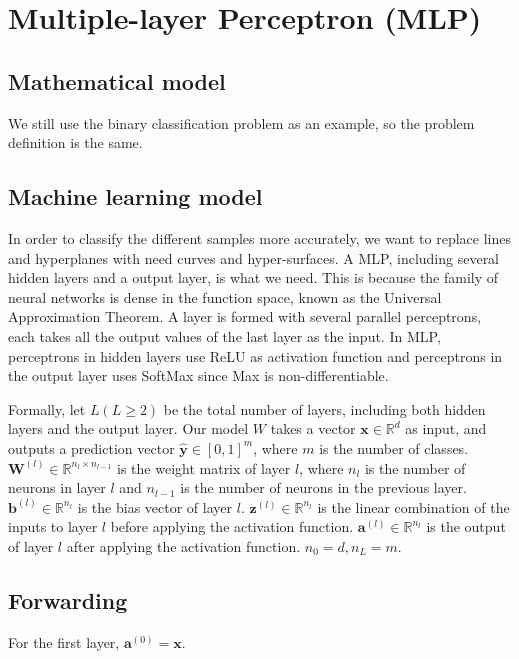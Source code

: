 \documentclass[12pt]{article}
\begin{document}
\section{Multiple-layer Perceptron (MLP)}

\subsection{Mathematical model}

We still use the binary classification problem as an example, so the problem definition is the same.

\subsection{Machine learning model}

In order to classify the different samples more accurately, we want to replace lines and hyperplanes with need curves and hyper-surfaces. A MLP, including several hidden layers and a output layer, is what we need. This is because the family of neural networks is dense in the function space, known as the Universal Approximation Theorem\cite{uat}. A layer is formed with several parallel perceptrons, each takes all the output values of the last layer as the input. In MLP, perceptrons in hidden layers use ReLU as activation function and perceptrons in the output layer uses SoftMax since Max is non-differentiable.

Formally, let $L(L\geq 2)$ be the total number of layers, including both hidden layers and the output layer. Our model $W$ takes a vector $\mathbf{x}\in\mathbb{R}^d$ as input, and outputs a prediction vector $\hat{\mathbf{y}}\in[0,1]^m$, where $m$ is the number of classes. $\mathbf{W}^{(l)} \in \mathbb{R}^{n_l \times n_{l-1}}$ is the weight matrix of layer $l$, where $n_l$ is the number of neurons in layer $l$ and $n_{l-1}$ is the number of neurons in the previous layer. $\mathbf{b}^{(l)} \in \mathbb{R}^{n_l}$ is the bias vector of layer $l$. $\mathbf{z}^{(l)} \in \mathbb{R}^{n_l}$ is the linear combination of the inputs to layer $l$ before applying the activation function. $\mathbf{a}^{(l)} \in \mathbb{R}^{n_l}$ is the output of layer $l$ after applying the activation function. $n_0=d,n_L=m$.

\subsection{Forwarding}

For the first layer, $\mathbf{a}^{(0)} = \mathbf{x}$.
\end{document}
